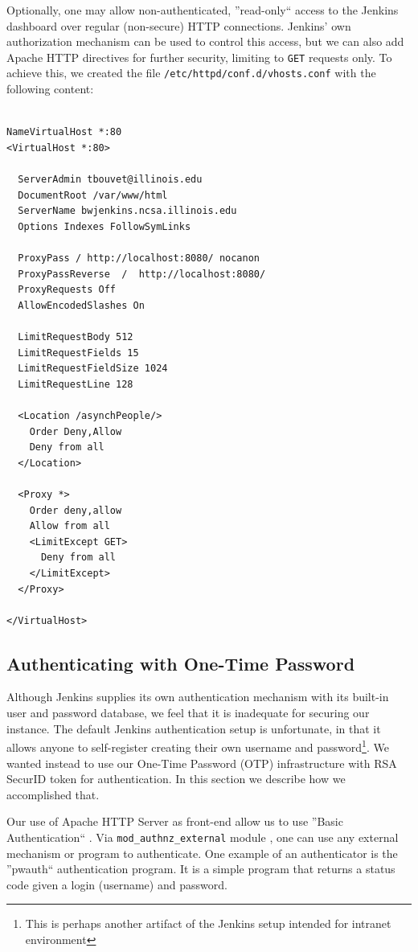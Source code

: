 \documentclass[AMA]{WileyNJD-v1}
\begin{document}
Optionally, one may allow non-authenticated, ''read-only`` access to the Jenkins dashboard over regular (non-secure) HTTP connections. 
Jenkins' own authorization mechanism can be used to control this access, but we can also add Apache HTTP directives for further security, limiting to \texttt{GET} requests only. 
To achieve this, we created the file \texttt{/etc/httpd/conf.d/vhosts.conf} with the following content:
\begin{lstlisting}
 
NameVirtualHost *:80
<VirtualHost *:80>

  ServerAdmin tbouvet@illinois.edu
  DocumentRoot /var/www/html
  ServerName bwjenkins.ncsa.illinois.edu
  Options Indexes FollowSymLinks

  ProxyPass / http://localhost:8080/ nocanon
  ProxyPassReverse  /  http://localhost:8080/
  ProxyRequests Off
  AllowEncodedSlashes On

  LimitRequestBody 512
  LimitRequestFields 15
  LimitRequestFieldSize 1024
  LimitRequestLine 128

  <Location /asynchPeople/>
    Order Deny,Allow
    Deny from all
  </Location>

  <Proxy *>
    Order deny,allow
    Allow from all
    <LimitExcept GET>
      Deny from all
    </LimitExcept>
  </Proxy>

</VirtualHost>

\end{lstlisting}

\subsection{Authenticating with One-Time Password}

Although Jenkins supplies its own authentication mechanism with its built-in user and password database, we feel that it is inadequate for securing our instance. 
The default Jenkins authentication setup is unfortunate, in that it allows anyone to self-register creating their own username and password\footnote{This is perhaps another artifact of the Jenkins setup intended for intranet environment}. 
We wanted instead to use our One-Time Password (OTP) infrastructure with RSA SecurID \cite{RSASecurID} token for authentication. 
In this section we describe how we accomplished that.

Our use of Apache HTTP Server as front-end allow us to use ''Basic Authentication`` \cite{ApacheBasicAuth}. Via \texttt{mod_authnz_external} module \cite{ApacheModAuthExt}, one can use any external mechanism or program to authenticate. 
One example of an authenticator is the ''pwauth`` authentication program. 
It is a simple program that returns a status code given a login (username) and password. 
\end{document}
